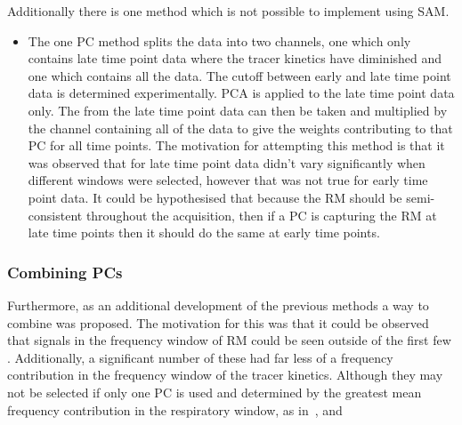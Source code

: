                     Additionally there is one method which is not possible to implement using \gls{SAM}.
                    
                    \begin{itemize}
                        \item The one \gls{PC} method splits the data into two channels, one which only contains late time point data where the tracer kinetics have diminished and one which contains all the data. The cutoff between early and late time point data is determined experimentally. \gls{PCA} is applied to the late time point data only. The  from the late time point data can then be taken and multiplied by the channel containing all of the data to give the weights contributing to that \gls{PC} for all time points. The motivation for attempting this method is that it was observed that  for late time point data didn't vary significantly when different windows were selected, however that was not true for early time point data. It could be hypothesised that because the \gls{RM} should be semi-consistent throughout the acquisition, then if a \gls{PC} is capturing the \gls{RM} at late time points then it should do the same at early time points.
                    \end{itemize}
                
                \subsubsection{Combining PCs} \label{sec:pca_data_driven_surrogate_signal_extraction_methods_for_dynamic_pet_methods_combining_pcs}
                    Furthermore, as an additional development of the previous methods a way to combine  was proposed. The motivation for this was that it could be observed that signals in the frequency window of \gls{RM} could be seen outside of the first few . Additionally, a significant number of these had far less of a frequency contribution in the frequency window of the tracer kinetics. Although they may not be selected if only one \gls{PC} is used and determined by the greatest mean frequency contribution in the respiratory window, as in~, and~
                    
